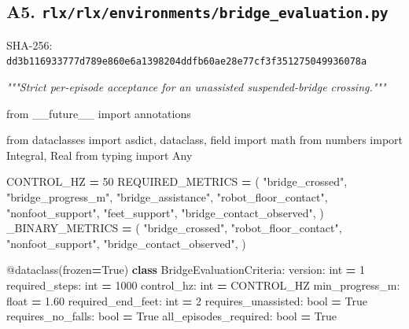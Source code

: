\documentclass[
  chinese,
  11pt,
  letterpaper,
]{article}
\newenvironment{Shaded}{\begin{snugshade}}{\end{snugshade}}
\newcommand{\AttributeTok}[1]{\textcolor[rgb]{0.13,0.29,0.53}{#1}}
\newcommand{\BuiltInTok}[1]{#1}
\newcommand{\CommentTok}[1]{\textcolor[rgb]{0.56,0.35,0.01}{\textit{#1}}}
\newcommand{\DecValTok}[1]{\textcolor[rgb]{0.00,0.00,0.81}{#1}}
\newcommand{\FloatTok}[1]{\textcolor[rgb]{0.00,0.00,0.81}{#1}}
\newcommand{\ImportTok}[1]{#1}
\newcommand{\KeywordTok}[1]{\textcolor[rgb]{0.13,0.29,0.53}{\textbf{#1}}}
\newcommand{\NormalTok}[1]{#1}
\newcommand{\OperatorTok}[1]{\textcolor[rgb]{0.81,0.36,0.00}{\textbf{#1}}}
\newcommand{\StringTok}[1]{\textcolor[rgb]{0.31,0.60,0.02}{#1}}
\newcommand{\VariableTok}[1]{\textcolor[rgb]{0.00,0.00,0.00}{#1}}
\renewenvironment{Shaded}{\par\smallskip}{\par\smallskip}
\begin{document}
\subsection{\texorpdfstring{A5.
\texttt{rlx/\allowbreak{}rlx/\allowbreak{}environm\allowbreak{}ents/\allowbreak{}bridge\_\allowbreak{}evaluati\allowbreak{}on.py}}{A5. }}\label{a5.-rlxrlxenvironmentsbridge_evaluation.py}

SHA-256:
\texttt{dd3b1169\allowbreak{}33777d78\allowbreak{}9e860e6a\allowbreak{}1398204d\allowbreak{}dfb60ae2\allowbreak{}8e77cf3f\allowbreak{}35127504\allowbreak{}9936078a\allowbreak{}}

\begin{Shaded}
\begin{Highlighting}[]
\CommentTok{"""Strict per{-}episode acceptance for an unassisted suspended{-}bridge crossing."""}

\ImportTok{from}\NormalTok{ \_\_future\_\_ }\ImportTok{import}\NormalTok{ annotations}

\ImportTok{from}\NormalTok{ dataclasses }\ImportTok{import}\NormalTok{ asdict, dataclass, field}
\ImportTok{import}\NormalTok{ math}
\ImportTok{from}\NormalTok{ numbers }\ImportTok{import}\NormalTok{ Integral, Real}
\ImportTok{from}\NormalTok{ typing }\ImportTok{import}\NormalTok{ Any}


\NormalTok{CONTROL\_HZ }\OperatorTok{=} \DecValTok{50}
\NormalTok{REQUIRED\_METRICS }\OperatorTok{=}\NormalTok{ (}
    \StringTok{"bridge\_crossed"}\NormalTok{,}
    \StringTok{"bridge\_progress\_m"}\NormalTok{,}
    \StringTok{"bridge\_assistance"}\NormalTok{,}
    \StringTok{"robot\_floor\_contact"}\NormalTok{,}
    \StringTok{"nonfoot\_support"}\NormalTok{,}
    \StringTok{"feet\_support"}\NormalTok{,}
    \StringTok{"bridge\_contact\_observed"}\NormalTok{,}
\NormalTok{)}
\NormalTok{\_BINARY\_METRICS }\OperatorTok{=}\NormalTok{ (}
    \StringTok{"bridge\_crossed"}\NormalTok{,}
    \StringTok{"robot\_floor\_contact"}\NormalTok{,}
    \StringTok{"nonfoot\_support"}\NormalTok{,}
    \StringTok{"bridge\_contact\_observed"}\NormalTok{,}
\NormalTok{)}


\AttributeTok{@dataclass}\NormalTok{(frozen}\OperatorTok{=}\VariableTok{True}\NormalTok{)}
\KeywordTok{class}\NormalTok{ BridgeEvaluationCriteria:}
\NormalTok{    version: }\BuiltInTok{int} \OperatorTok{=} \DecValTok{1}
\NormalTok{    required\_steps: }\BuiltInTok{int} \OperatorTok{=} \DecValTok{1000}
\NormalTok{    control\_hz: }\BuiltInTok{int} \OperatorTok{=}\NormalTok{ CONTROL\_HZ}
\NormalTok{    min\_progress\_m: }\BuiltInTok{float} \OperatorTok{=} \FloatTok{1.60}
\NormalTok{    required\_end\_feet: }\BuiltInTok{int} \OperatorTok{=} \DecValTok{2}
\NormalTok{    requires\_unassisted: }\BuiltInTok{bool} \OperatorTok{=} \VariableTok{True}
\NormalTok{    requires\_no\_falls: }\BuiltInTok{bool} \OperatorTok{=} \VariableTok{True}
\NormalTok{    all\_episodes\_required: }\BuiltInTok{bool} \OperatorTok{=} \VariableTok{True}


\end{Highlighting}
\end{Shaded}
\end{document}
